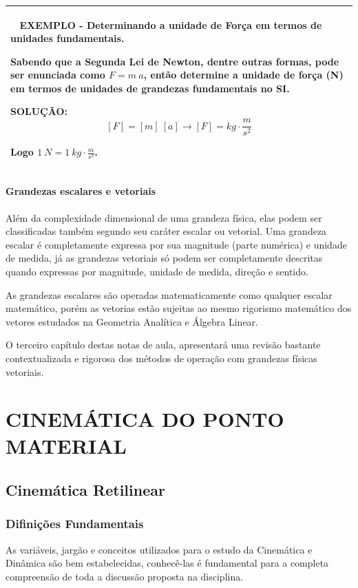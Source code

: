 \documentclass[a4paper, 11pt]{report}
\newenvironment{myboxed}
    {
        \begin{center}
        \begin{tabular}{p{0.7\textwidth}}
        \hline\
    }
    { 
        \\\hline
        \end{tabular} 
        \end{center}
    }
\begin{document}
\begin{myboxed}
    \textbf{EXEMPLO - Determinando a unidade de Força em termos de unidades
    fundamentais.}

    Sabendo que a Segunda Lei de Newton, dentre outras formas, pode ser 
    enunciada como $F = m \: a$, então determine a unidade de força (N) em 
    termos de unidades de grandezas fundamentais no SI.

    \textbf{SOLUÇÃO:}
    $$
    [F] = [m] \: [a] \rightarrow
    [F] = kg \cdot \frac{m}{s^2}
    $$

    Logo $1 \: N = 1 \: kg \cdot \frac{m}{s^2}$.

\end{myboxed}

\subsubsection{Grandezas escalares e vetoriais}

Além da complexidade dimensional de uma grandeza física, elas podem ser 
classificadas também segundo seu caráter escalar ou vetorial. Uma grandeza 
escalar é completamente expressa por sua magnitude (parte numérica) e unidade
de medida, já as grandezas vetoriais só podem ser completamente descritas 
quando expressas por magnitude, unidade de medida, direção e sentido. 

As grandezas escalares são operadas matematicamente como qualquer escalar 
matemático, porém as vetorias estão sujeitas ao mesmo rigorismo matemático 
dos vetores estudados na Geometria Analítica e Álgebra Linear. 

O terceiro capítulo destas notas de aula, apresentará uma revisão bastante 
contextualizada e rigorosa dos métodos de operação com grandezas físicas
vetoriais.

\chapter{CINEMÁTICA DO PONTO MATERIAL}

\section{Cinemática Retilinear}
\subsection{Difinições Fundamentais}
As variáveis, jargão e conceitos utilizados para o estudo da Cinemática e 
Dinâmica são bem estabelecidas, conhecê-las é fundamental para a completa 
compreensão de toda a discussão proposta na disciplina. 
\end{document}
